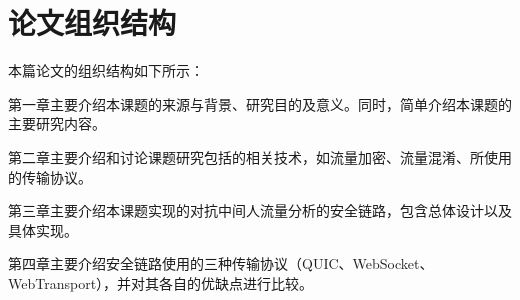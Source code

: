 \section{论文组织结构}
本篇论文的组织结构如下所示：

第一章主要介绍本课题的来源与背景、研究目的及意义。同时，简单介绍本课题的主要研究内容。

第二章主要介绍和讨论课题研究包括的相关技术，如流量加密、流量混淆、所使用的传输协议。

第三章主要介绍本课题实现的对抗中间人流量分析的安全链路，包含总体设计以及具体实现。

第四章主要介绍安全链路使用的三种传输协议（QUIC、WebSocket、WebTransport），并对其各自的优缺点进行比较。